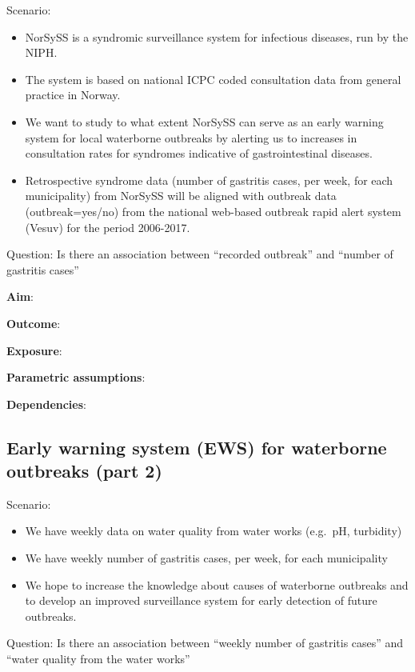 \documentclass[12pt,]{article}
\providecommand{\tightlist}{%
  \setlength{\itemsep}{0pt}\setlength{\parskip}{0pt}}
\begin{document}
Scenario:

\begin{itemize}
\tightlist
\item
  NorSySS is a syndromic surveillance system for infectious diseases,
  run by the NIPH.
\item
  The system is based on national ICPC coded consultation data from
  general practice in Norway.
\item
  We want to study to what extent NorSySS can serve as an early warning
  system for local waterborne outbreaks by alerting us to increases in
  consultation rates for syndromes indicative of gastrointestinal
  diseases.\\
\item
  Retrospective syndrome data (number of gastritis cases, per week, for
  each municipality) from NorSySS will be aligned with outbreak data
  (outbreak=yes/no) from the national web-based outbreak rapid alert
  system (Vesuv) for the period 2006-2017.
\end{itemize}

Question: Is there an association between ``recorded outbreak'' and
``number of gastritis cases''

\textbf{Aim}:

\textbf{Outcome}:

\textbf{Exposure}:

\textbf{Parametric assumptions}:

\textbf{Dependencies}:

\subsection{Early warning system (EWS) for waterborne outbreaks (part
2)}\label{early-warning-system-ews-for-waterborne-outbreaks-part-2}

Scenario:

\begin{itemize}
\tightlist
\item
  We have weekly data on water quality from water works (e.g.~pH,
  turbidity)
\item
  We have weekly number of gastritis cases, per week, for each
  municipality
\item
  We hope to increase the knowledge about causes of waterborne outbreaks
  and to develop an improved surveillance system for early detection of
  future outbreaks.
\end{itemize}

Question: Is there an association between ``weekly number of gastritis
cases'' and ``water quality from the water works''
\end{document}
